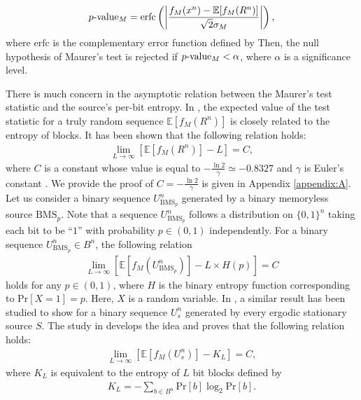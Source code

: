 \begin{align}
	p\mathchar`- \mathrm{value}_M 
	= \mathrm{erfc} \left( \left| \frac{f_M(x^n) - \mathbb{E}[f_M(R^n)]}{\sqrt{2} \sigma_M} \right| \right),
\end{align}
where $\mathrm{erfc}$ is the complementary error function defined by
Then, the null hypothesis of Maurer's test is rejected if $p\mathchar`- \mathrm{value}_M < \alpha$, where $\alpha$ is a significance level.
\par
There is much concern in the asymptotic relation between the Maurer's test statistic and the source's per-bit entropy. In \cite{maurer1992universal}, the expected value of the test statistic for a truly random sequence $\mathbb{E}[f_M(R^n)]$ is closely related to the entropy of blocks. It has been shown that the following relation holds:
\begin{align}\label{eq:maurer_asymptotic_R}
	\lim_{L\to\infty} \left[ \mathbb{E}[f_M(R^n)] -L \right] = C,
\end{align}
where $C$ is a constant whose value is equal to $-\frac{\ln 2}{\gamma} \simeq -0.8327$ and $\gamma$ is Euler's constant \cite{hardy1979introduction}. We provide the proof of $C=-\frac{\ln 2}{\gamma}$ is given in Appendix \ref{appendix:A}. 
%
Let us consider a binary sequence $U_{\mathrm{BMS}_p}^n$ generated by a binary memoryless source $\mathrm{BMS}_p$. Note that a sequence $U_{\mathrm{BMS}_p}^n$ follows a distribution on $\{0,1\}^n$ taking each bit to be ``$1$'' with probability $p\in (0,1)$ independently. 
%
For a binary sequence $U_{\mathrm{BMS}_p}^n \in B^n$, the following relation
\begin{align}
	\lim_{L\to\infty} \left[ \mathbb{E}[f_M(U_{\mathrm{BMS}_p}^n)] -L\times H(p) \right] = C
\end{align}
holds for any $p \in (0,1)$, where $H$ is the binary entropy function corresponding to $\mathrm{Pr}[X=1]=p$. Here, $X$ is a random variable. 
%
In \cite{maurer1992universal}, a similar result has been studied to show for a binary sequence $U_s^n$ generated by every ergodic stationary source $S$. The study in \cite{coron1998accurate} develops the idea and proves that the following relation holds:
\begin{align}
	\lim_{L\to\infty} \left[ \mathbb{E}[f_M(U_s^n)] - K_L \right] = C,
\end{align}
where $K_L$ is equivalent to the entropy of $L$ bit blocks defined by
\begin{align}\label{eq:K_L}
	K_L = -\sum_{b \in B^n} \mathrm{Pr}[b] \log_2 \mathrm{Pr}[b].
\end{align}
